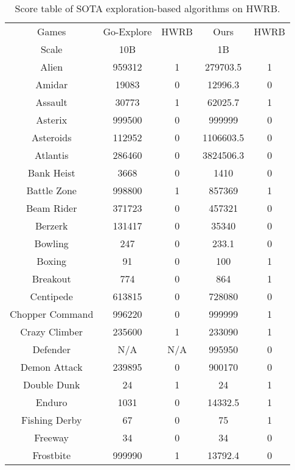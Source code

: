 \clearpage  
\begin{table}[!hb]
\footnotesize
\begin{center}
\caption{Score table of  SOTA exploration-based algorithms on HWRB.}
\label{Tab:Score table of SOTA  exploration-based algorithms on HWRB.}
\setlength{\tabcolsep}{1.0pt}
\begin{tabular}{c cc cc }
\toprule
Games & Go-Explore & HWRB & Ours & HWRB \\ 
        Scale & 10B & ~ & 1B &   \\ \midrule
        Alien & 959312 & 1  & 279703.5 & 1  \\  
        Amidar & 19083 & 0  & 12996.3 & 0  \\  
        Assault & 30773 & 1  & 62025.7 & 1  \\  
        Asterix & 999500 & 0  & 999999 & 0  \\  
        Asteroids & 112952 & 0  & 1106603.5 & 0  \\  
        Atlantis & 286460 & 0  & 3824506.3 & 0  \\  
        Bank Heist & 3668 & 0  & 1410 & 0  \\  
        Battle Zone & 998800 & 1  & 857369 & 1  \\  
        Beam Rider & 371723 & 0  & 457321 & 0  \\  
        Berzerk & 131417 & 0  & 35340 & 0  \\  
        Bowling & 247 & 0  & 233.1 & 0  \\  
        Boxing & 91 & 0  & 100 & 1  \\  
        Breakout & 774 & 0  & 864 & 1  \\  
        Centipede & 613815 & 0  & 728080 & 0  \\  
        Chopper Command & 996220 & 0  & 999999 & 1  \\  
        Crazy Climber & 235600 & 1  & 233090 & 1  \\  
        Defender & N/A & N/A & 995950 & 0  \\  
        Demon Attack & 239895 & 0  & 900170 & 0  \\  
        Double Dunk & 24 & 1  & 24 & 1  \\  
        Enduro & 1031 & 0  & 14332.5 & 1  \\  
        Fishing Derby & 67 & 0  & 75 & 1  \\  
        Freeway & 34 & 0  & 34 & 0  \\  
        Frostbite & 999990 & 1  & 13792.4 & 0  \\  

\end{tabular}
\end{center}
\end{table}
